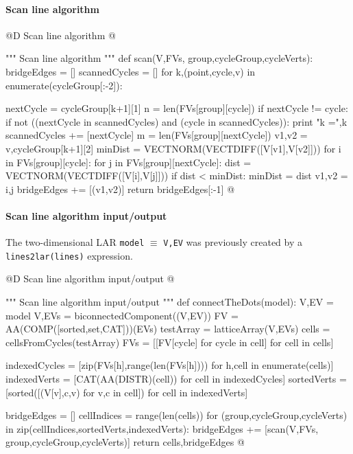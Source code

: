 \documentclass[11pt,oneside]{article}	%
\begin{document}
\paragraph{Scan line algorithm}
@D Scan line algorithm 
@{""" Scan line algorithm """
def scan(V,FVs, group,cycleGroup,cycleVerts):
    bridgeEdges = []
    scannedCycles = []
    for k,(point,cycle,v) in enumerate(cycleGroup[:-2]):
    	
        nextCycle = cycleGroup[k+1][1]
        n = len(FVs[group][cycle])
        if nextCycle != cycle: 
            if not ((nextCycle in scannedCycles) and (cycle in scannedCycles)):
                print "k =",k
                scannedCycles += [nextCycle]
                m = len(FVs[group][nextCycle])
                v1,v2 = v,cycleGroup[k+1][2]
                minDist = VECTNORM(VECTDIFF([V[v1],V[v2]]))
                for i in FVs[group][cycle]:
                    for j in FVs[group][nextCycle]:
                        dist = VECTNORM(VECTDIFF([V[i],V[j]]))
                        if  dist < minDist: 
                            minDist = dist
                            v1,v2 = i,j
                bridgeEdges += [(v1,v2)]
    return bridgeEdges[:-1]
@}

\paragraph{Scan line algorithm input/output}

The two-dimensional LAR \texttt{model} $\equiv$ \texttt{V,EV} was previously created by a \texttt{lines2lar(lines)} expression.

@D Scan line algorithm input/output
@{""" Scan line algorithm input/output """
def connectTheDots(model):
    V,EV = model
    V,EVs = biconnectedComponent((V,EV))
    FV = AA(COMP([sorted,set,CAT]))(EVs)
    testArray = latticeArray(V,EVs)
    cells = cellsFromCycles(testArray)
    FVs = [[FV[cycle] for cycle in cell] for cell in cells]
    
    indexedCycles = [zip(FVs[h],range(len(FVs[h])))   for h,cell in enumerate(cells)]
    indexedVerts = [CAT(AA(DISTR)(cell)) for cell in indexedCycles]
    sortedVerts = [sorted([(V[v],c,v) for v,c in cell]) for cell in indexedVerts]
    
    bridgeEdges = []
    cellIndices = range(len(cells))
    for (group,cycleGroup,cycleVerts) in zip(cellIndices,sortedVerts,indexedVerts):
        bridgeEdges += [scan(V,FVs, group,cycleGroup,cycleVerts)]
    return cells,bridgeEdges
@}
\end{document}
